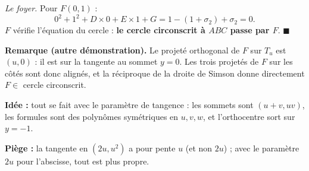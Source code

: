 \begin{enumerate}[itemsep=14pt]
  \emph{Le foyer.} Pour $F(0,1)$ :
  \[0^2+1^2+D\times0+E\times1+G=1-(1+\sigma_2)+\sigma_2=0.\]
  $F$ vérifie l'équation du cercle : \textbf{le cercle circonscrit à $ABC$ passe par $F$}. $\blacksquare$
\end{enumerate}

\textbf{Remarque (autre démonstration).} Le projeté orthogonal de $F$ sur $T_u$ est $(u,0)$ : il est sur la tangente au sommet $y=0$. Les trois projetés de $F$ sur les côtés sont donc alignés, et la réciproque de la droite de Simson donne directement $F\in$ cercle circonscrit.

\textbf{Idée :} tout se fait avec le paramètre de tangence : les sommets sont $(u+v,uv)$, les formules sont des polynômes symétriques en $u,v,w$, et l'orthocentre sort sur $y=-1$.

\textbf{Piège :} la tangente en $(2u,u^2)$ a pour pente $u$ (et non $2u$) ; avec le paramètre $2u$ pour l'abscisse, tout est plus propre.
